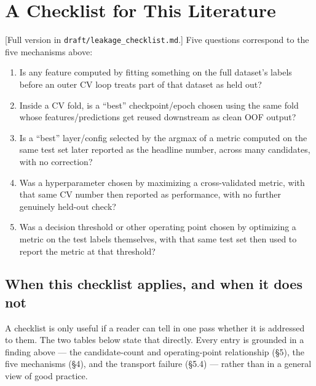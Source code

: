 \documentclass[10pt]{article} %
\begin{document}
\section{A Checklist for This Literature}

[Full version in \texttt{draft/leakage\_checklist.md}.] Five questions correspond
to the five mechanisms above:

\begin{enumerate}
\item Is any feature computed by fitting something on the full dataset's
   labels before an outer CV loop treats part of that dataset as held out?
\item Inside a CV fold, is a ``best'' checkpoint/epoch chosen using the same
   fold whose features/predictions get reused downstream as clean OOF
   output?
\item Is a ``best'' layer/config selected by the argmax of a metric computed
   on the same test set later reported as the headline number, across
   many candidates, with no correction?
\item Was a hyperparameter chosen by maximizing a cross-validated metric,
   with that same CV number then reported as performance, with no
   further genuinely held-out check?
\item Was a decision threshold or other operating point chosen by
   optimizing a metric on the test labels themselves, with that same
   test set then used to report the metric at that threshold?
\end{enumerate}

\subsection{When this checklist applies, and when it does not}
\label{sec:checklist-scope}

A checklist is only useful if a reader can tell in one pass whether it is
addressed to them. The two tables below state that directly. Every
entry is grounded in a finding above --- the candidate-count and
operating-point relationship (§5), the five mechanisms (§4), and the
transport failure (§5.4) --- rather than in a general view of good practice.
\end{document}

